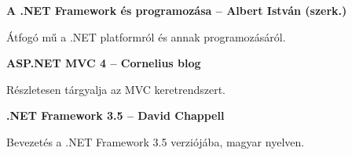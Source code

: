 \textbf{A .NET Framework és programozása – Albert István (szerk.)}

Átfogó mű a .NET platformról és annak programozásáról.




\textbf{ASP.NET MVC 4 – Cornelius blog}

Részletesen tárgyalja az MVC keretrendszert. 


 \textbf{.NET Framework 3.5 – David Chappell}

Bevezetés a .NET Framework 3.5 verziójába, magyar nyelven.

